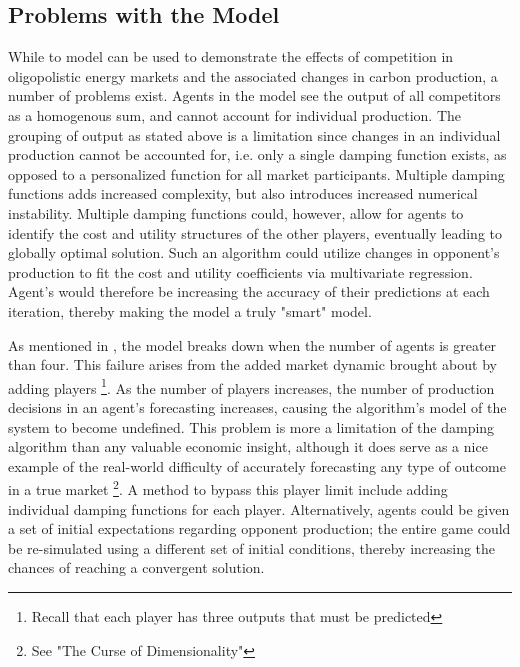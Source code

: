 \documentclass[12pt]{article}
\begin{document}
\subsection{Problems with the Model} \label{problems}
While to model can be used to demonstrate the effects of competition in oligopolistic energy markets and the associated changes in carbon production, a number of problems exist. Agents in the model see the output of all competitors as a homogenous sum, and cannot account for individual production. The grouping of output as stated above is a limitation since changes in an individual production cannot be accounted for, i.e. only a single damping function exists, as opposed to a personalized function for all market participants. Multiple damping functions adds increased complexity, but also introduces increased numerical instability. Multiple damping functions could, however, allow for agents to identify the cost and utility structures of the other players, eventually leading to globally optimal solution. Such an algorithm could utilize changes in opponent's production to fit the cost and utility coefficients via multivariate regression. Agent's  would therefore be increasing the accuracy of their predictions at each iteration, thereby making the model a truly "smart" model.\*

As mentioned in , the model breaks down when the number of agents is greater than four. This failure arises from the added market dynamic brought about by adding players \footnote{Recall that each player has three outputs that must be predicted}. As the number of players increases, the number of production decisions in an agent's forecasting increases, causing the algorithm's model of the system to become undefined. This problem is more a limitation of the damping algorithm than any valuable economic insight, although it does serve as a nice example of the real-world difficulty of accurately forecasting any type of outcome in a true market \footnote{See "The Curse of Dimensionality"}. A method to bypass this player limit include adding individual damping functions for each player. Alternatively, agents could be given a set of initial expectations regarding opponent production; the entire game could be re-simulated using a different set of initial conditions, thereby increasing the chances of reaching a convergent solution. 
\end{document}

